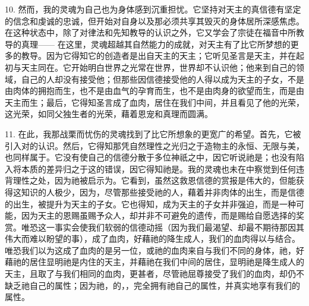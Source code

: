 10. 然而，我的灵魂为自己也为身体感到沉重担忧。它坚持对天主的真信德有坚定的信念和虔诚的忠诚，但开始对自身以及那必须共享其毁灭的身体居所深感焦虑。在这种状态中，除了对律法和先知教导的认识之外，它又学会了宗徒在福音中所教导的真理—— 在这里，灵魂超越其自然能力的成就，对天主有了比它所梦想的更多的教导。因为它得知它的创造者是出自天主的天主；它听见圣言是天主，并在起初与天主同在。它开始明白世界之光常在世界，世界却不认识他；他来到自己的领域，自己的人却没有接受他；但那些因信德接受他的人得以成为天主的子女，不是由肉体的拥抱而生，也不是由血气的孕育而生，也不是由肉身的欲望而生，而是由天主而生；最后，它得知圣言成了血肉，居住在我们中间，并且看见了他的光荣，这光荣，如同父独生者的光荣，藉着恩宠和真理而圆满。\par

11. 在此，我那战栗而忧伤的灵魂找到了比它所想象的更宽广的希望。首先，它被引入对的认识。然后，它得知那凭自然理性之光归之于造物主的永恒、无限与美，也同样属于。它没有使自己的信德分散于多位神祇之中，因它听说祂是；也没有陷入将本质的差异归之于这的错误，因它得知祂是。我的灵魂也未在中察觉到任何违背理性之处，因为祂被启示为。它看到，虽然这救恩信德的赏报是伟大的，但能获得这知识的人极少，因为，尽管那些接受祂的人，藉着并非肉体的出生，而是信德的出生，被提升为天主的子女。它也得知，成为天主的子女并非强迫，而是一种可能，因为天主的恩赐虽赐予众人，却并非不可避免的遗传，而是赐给自愿选择的奖赏。唯恐这一事实会使我们软弱的信德动摇（因为我们最渴望、却最不期待那因其伟大而难以盼望的事），成了血肉，好藉祂的降生成人，我们的血肉得以与结合。唯恐我们以为这成了血肉的是另一位，或祂的血肉来自与我们不同的身体，祂，好藉祂的居住显明祂是内住的天主，并藉祂在我们中间的居住，显明祂是降生成人的天主，且取了与我们相同的血肉，更甚者，尽管祂屈尊接受了我们的血肉，却仍不缺乏祂自己的属性；因为祂，的，，完全拥有祂自己的属性，并真实地享有我们的属性。\par

